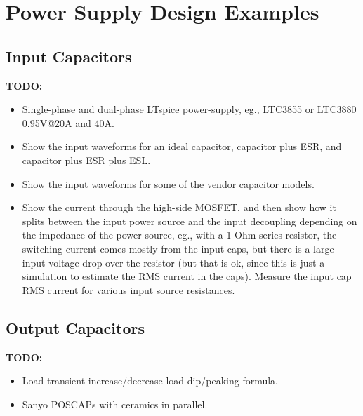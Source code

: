 \documentclass[10pt,twoside]{article}
\begin{document}
\clearpage
\section{Power Supply Design Examples}

\subsection{Input Capacitors}

{\bf TODO:}
\begin{itemize}
\item Single-phase and dual-phase LTspice power-supply, eg.,
LTC3855 or LTC3880 0.95V@20A and 40A.
\item Show the input waveforms for an ideal capacitor,
capacitor plus ESR, and capacitor plus ESR plus ESL.
\item Show the input waveforms for some of the vendor
capacitor models.
\item Show the current through the high-side MOSFET, and
then show how it splits between the input power source and
the input decoupling depending on the impedance of the
power source, eg., with a 1-Ohm series resistor, the switching
current comes mostly from the input caps, but there is a large
input voltage drop over the resistor (but that is ok, since this
is just a simulation to estimate the RMS current in the caps).
Measure the input cap RMS current for various input source
resistances.
\end{itemize}

\subsection{Output Capacitors}

{\bf TODO:}
\begin{itemize}
\item Load transient increase/decrease load dip/peaking formula.
\item Sanyo POSCAPs with ceramics in parallel.
\end{itemize}

\clearpage
%



\end{document}

